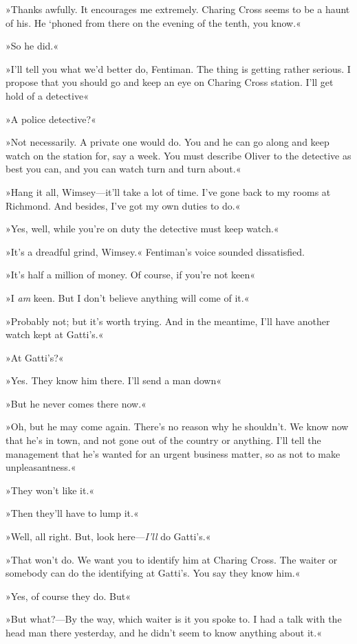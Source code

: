 »Thanks awfully. It encourages me extremely. Charing Cross seems to be a haunt of his. He `phoned from there on the evening of the tenth, you know.«

»So he did.«

»I'll tell you what we'd better do, Fentiman. The thing is getting rather serious. I propose that you should go and keep an eye on Charing Cross station. I'll get hold of a detective\longdash«

»A police detective?«

»Not necessarily. A private one would do. You and he can go along and keep watch on the station for, say a week. You must describe Oliver to the detective as best you can, and you can watch turn and turn about.«

»Hang it all, Wimsey—it'll take a lot of time. I've gone back to my rooms at Richmond. And besides, I've got my own duties to do.«

»Yes, well, while you're on duty the detective must keep watch.«

»It's a dreadful grind, Wimsey.« Fentiman's voice sounded dissatisfied.

»It's half a million of money. Of course, if you're not keen\longdash«

»I \textit{am} keen. But I don't believe anything will come of it.«

»Probably not; but it's worth trying. And in the meantime, I'll have another watch kept at Gatti's.«

»At Gatti's?«

»Yes. They know him there. I'll send a man down\longdash«

»But he never comes there now.«

»Oh, but he may come again. There's no reason why he shouldn't. We know now that he's in town, and not gone out of the country or anything. I'll tell the management that he's wanted for an urgent business matter, so as not to make unpleasantness.«

»They won't like it.«

»Then they'll have to lump it.«

»Well, all right. But, look here—\textit{I'll} do Gatti's.«

»That won't do. We want you to identify him at Charing Cross. The waiter or somebody can do the identifying at Gatti's. You say they know him.«

»Yes, of course they do. But\longdash«

»But what?—By the way, which waiter is it you spoke to. I had a talk with the head man there yesterday, and he didn't seem to know anything about it.«

